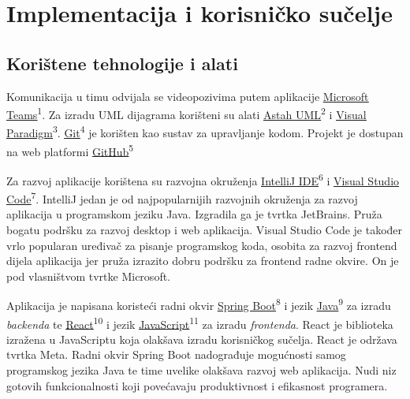 \chapter{Implementacija i korisničko sučelje}
		
		
		\section{Korištene tehnologije i alati}
		
			Komunikacija u timu odvijala se videopozivima putem aplikacije \underline{\href{https://www.microsoft.com/en-us/microsoft-teams/group-chat-software}{Microsoft Teams}}\textsuperscript{1}. Za izradu UML dijagrama korišteni su alati \underline{\href{https://astah.net/products/astah-uml/}{Astah UML}}\textsuperscript{2} i \underline{\href{https://online.visual-paradigm.com/}{Visual Paradigm}}\textsuperscript{3}. \underline{\href{https://git-scm.com/}{Git}}\textsuperscript{4} je korišten kao sustav za upravljanje kodom. Projekt je dostupan na web platformi \underline{\href{https://github.com/}{GitHub}}\textsuperscript{5}
			
			\indent Za razvoj aplikacije korištena su razvojna okruženja \underline{\href{https://www.jetbrains.com/idea/}{IntelliJ IDE}}\textsuperscript{6} i \newline\underline{\href{https://code.visualstudio.com/}{Visual Studio Code}}\textsuperscript{7}. IntelliJ jedan je od najpopularnijih razvojnih okruženja za razvoj aplikacija u programskom jeziku Java. Izgradila ga je tvrtka JetBrains. Pruža bogatu podršku za razvoj desktop i web aplikacija. Visual Studio Code je također vrlo popularan uređivač za pisanje programskog koda, osobita za razvoj frontend dijela aplikacija jer pruža izrazito dobru podršku za frontend radne okvire. On je pod vlasništvom tvrtke Microsoft.
			
			\indent Aplikacija je napisana koristeći radni okvir \underline{\href{https://spring.io/projects/spring-boot/}{Spring Boot}}\textsuperscript{8} i jezik \underline{\href{https://www.oracle.com/java/}{Java}}\textsuperscript{9} za izradu \textit{backenda} te \underline{\href{https://react.dev/}{React}}\textsuperscript{10} i jezik \underline{\href{https://www.javascript.com/}{JavaScript}}\textsuperscript{11} za izradu \textit{frontenda}. React je biblioteka izražena u JavaScriptu koja olakšava izradu korisničkog sučelja. React je održava tvrtka Meta. Radni okvir Spring Boot nadograđuje mogućnosti samog programskog jezika Java te time uvelike olakšava razvoj web aplikacija. Nudi niz gotovih funkcionalnosti koji povećavaju produktivnost i efikasnost programera.
			
